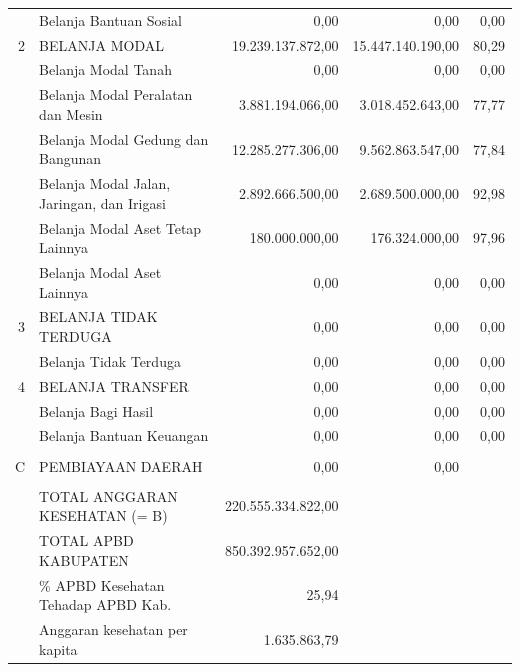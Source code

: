 \begin{longtable}{rY{30em}rrr}
	      & Belanja Bantuan Sosial                             &               0,00 &               0,00 &   0,00 \\
	    2 & BELANJA MODAL                                      &  19.239.137.872,00 &  15.447.140.190,00 &  80,29 \\
	      & Belanja Modal Tanah                                &               0,00 &               0,00 &   0,00 \\
	      & Belanja Modal Peralatan dan Mesin                  &   3.881.194.066,00 &   3.018.452.643,00 &  77,77 \\
	      & Belanja Modal Gedung dan Bangunan                  &  12.285.277.306,00 &   9.562.863.547,00 &  77,84 \\
	      & Belanja Modal Jalan, Jaringan, dan Irigasi         &   2.892.666.500,00 &   2.689.500.000,00 &  92,98 \\
	      & Belanja Modal Aset Tetap Lainnya                   &     180.000.000,00 &     176.324.000,00 &  97,96 \\
	      & Belanja Modal Aset Lainnya                         &               0,00 &               0,00 &   0,00 \\
	    3 & BELANJA TIDAK TERDUGA                              &               0,00 &               0,00 &   0,00 \\
	      & Belanja Tidak Terduga                              &               0,00 &               0,00 &   0,00 \\
	    4 & BELANJA TRANSFER                                   &               0,00 &               0,00 &   0,00 \\
	      & Belanja Bagi Hasil                                 &               0,00 &               0,00 &   0,00 \\
	      & Belanja Bantuan Keuangan                           &               0,00 &               0,00 &   0,00 \\
	      &                                                    &                    &                    &        \\
	    C & PEMBIAYAAN DAERAH                                  &               0,00 &               0,00 &        \\
	      &                                                    &                    &                    &        \\
	      & TOTAL ANGGARAN KESEHATAN (= B)                     & 220.555.334.822,00 &                    &        \\
	      & TOTAL APBD KABUPATEN                               & 850.392.957.652,00 &                    &        \\
	      & \% APBD Kesehatan Tehadap APBD Kab.                &              25,94 &                    &        \\
	      & Anggaran kesehatan per kapita                      &       1.635.863,79 &                    &      \\
	\bottomrule
\end{longtable}

